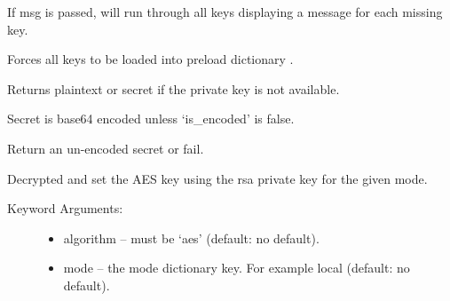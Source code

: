 \documentclass[letterpaper,10pt,english]{sphinxmanual}
\begin{document}
\begin{fulllineitems}
\begin{fulllineitems}
If msg is passed, will run through all keys displaying a message for each
missing key.

\end{fulllineitems}


\begin{fulllineitems}
\label{base_classes:bhp_crypto.classes.Cryptor.preload_all_keys}
Forces all keys to be loaded into preload dictionary .

\end{fulllineitems}


\begin{fulllineitems}
\label{base_classes:bhp_crypto.classes.Cryptor.rsa_decrypt}
Returns plaintext or secret if the private key is not available.

Secret is base64 encoded unless `is\_encoded' is false.

\end{fulllineitems}


\begin{fulllineitems}
\label{base_classes:bhp_crypto.classes.Cryptor.rsa_encrypt}
Return an un-encoded secret or fail.

\end{fulllineitems}


\begin{fulllineitems}
\label{base_classes:bhp_crypto.classes.Cryptor.set_aes_key}
Decrypted and set the AES key using the rsa private key for the given mode.
\begin{description}
\item[{Keyword Arguments:}] \leavevmode\begin{itemize}
\item {} 
algorithm -- must be `aes' (default: no default).

\item {} 
mode -- the mode dictionary key. For example local (default: no default).


\end{itemize}
\end{description}
\end{fulllineitems}
\end{fulllineitems}
\end{document}
